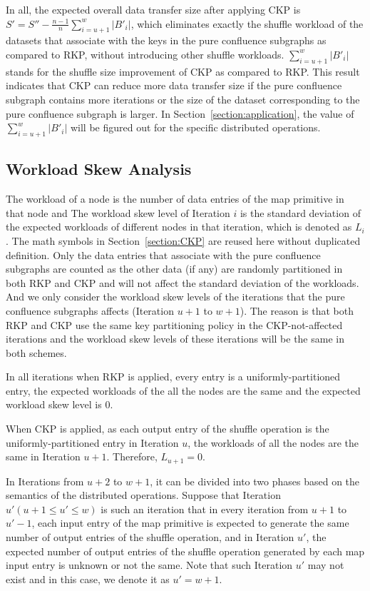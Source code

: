 \documentclass[10pt,journal,compsoc]{IEEEtran}
\begin{document}
In all, the expected overall data transfer size after applying CKP 
is $S'=S''- \frac{n-1}{n}\sum_{i=u+1}^w |B'_i|$, 
which eliminates exactly the shuffle workload of the datasets that associate with the keys in the pure confluence subgraphs as compared to RKP, without introducing other shuffle workloads. 
$\sum_{i=u+1}^w |B'_i|$ stands for the shuffle size improvement of CKP as compared to RKP.
This result indicates that CKP can reduce more data transfer size 
if the pure confluence subgraph contains more iterations 
or the size of the dataset corresponding to the pure confluence subgraph is larger. 
In Section~\ref{section:application}, the value of $\sum_{i=u+1}^w |B'_i|$ will be figured out for the specific distributed operations.


\subsection{Workload Skew Analysis}\label{section:skew}
The workload of a node is the number of data entries of the map primitive in that node and 
The workload skew level of Iteration $i$ is the standard deviation of the expected workloads of different nodes in that iteration, which is denoted as $L_i$. 
The math symbols in Section~\ref{section:CKP} are reused here without duplicated definition. 
Only the data entries that associate with the pure confluence subgraphs are counted as the other data (if any) are randomly partitioned in both RKP and CKP and will not affect the standard deviation of the workloads.
And we only consider the workload skew levels of the iterations that the pure confluence subgraphs affects (Iteration $u+1$ to $w+1$).
The reason is that both RKP and CKP use the same key partitioning policy in the CKP-not-affected iterations and the workload skew levels of these iterations will be the same in both schemes.


In all iterations when RKP is applied, every entry is a uniformly-partitioned entry, the expected workloads of the all the nodes are the same and the expected workload skew level is 0. 

When CKP is applied, as each output entry of the shuffle operation is the uniformly-partitioned entry in Iteration $u$, the workloads of all the nodes are the same in Iteration $u+1$. 
Therefore, $L_{u+1}=0$.

In Iterations from $u+2$ to $w+1$, 
it can be divided into two phases based on the semantics of the distributed operations. 
Suppose that Iteration $u' (u+1 \leq u' \leq w)$ is such an iteration that in every iteration from $u+1$ to $u'-1$, each input entry of the map primitive is expected to generate the same number of output entries of the shuffle operation, and in Iteration $u'$, the expected number of output entries of the shuffle operation generated by each map input entry is unknown or not the same. 
Note that such Iteration $u'$ may not exist and in this case, we denote it as $u'=w+1$. 
\end{document}
